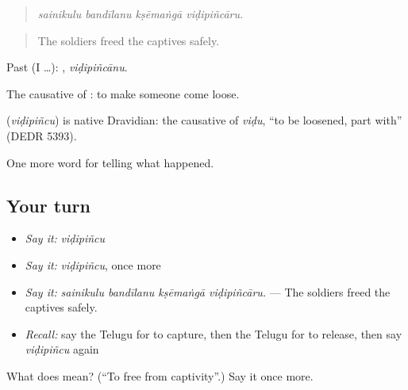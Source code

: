 \begin{quote}
\emph{sainikulu bandīlanu kṣēmaṅgā viḍipiñcāru.}
\end{quote}

\begin{quote}
The soldiers freed the captives safely.
\end{quote}

Past (I …): , \emph{viḍipiñcānu}.

The causative of : to make someone come loose.

\begin{cousinweb}
\textbf{} (\emph{viḍipiñcu}) is native Dravidian: the causative of \emph{viḍu}, \textquotedblleft{}to be loosened, part with\textquotedblright{} (DEDR 5393).
\end{cousinweb}

\begin{grammarlens}[title={What you've built}]
One more word for telling what happened.
\end{grammarlens}

\subsection*{Your turn}
\begin{itemize}
\raggedright
  \item \emph{Say it:} \emph{viḍipiñcu}
  \item \emph{Say it:} \emph{viḍipiñcu}, once more
  \item \emph{Say it:} \emph{sainikulu bandīlanu kṣēmaṅgā viḍipiñcāru.} — The soldiers freed the captives safely.
  \item \emph{Recall:} say the Telugu for to capture, then the Telugu for to release, then say \emph{viḍipiñcu} again
\end{itemize}

\begin{tcolorbox}[breakable,colback=teal!4,colframe=teal!35!black,title={Before you move on}]
What does  mean? (\textquotedblleft{}To free from captivity\textquotedblright{}.) Say it once more.
\end{tcolorbox}
